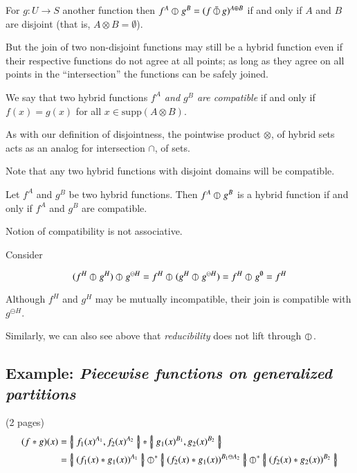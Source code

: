 For $g:U \to S$ another function then $f^A \varobar^{} g^B = (f \,\bar{\varobar}\, g)^{A \oplus B}$ if and only if $A$ and $B$ are disjoint (that is, $A \otimes B = \emptyset$).

But the join of two non-disjoint functions may still be a hybrid function even if their respective functions do not agree at all points; as long as they agree on all points in the ``intersection'' the functions can be safely joined.

\begin{definition}
We say that two hybrid functions \emph{$f^A$ and $g^B$ are compatible} if and only if $f(x) = g(x)$ for all $x \in \text{supp} (A \otimes B)$.
\end{definition}

As with our definition of disjointness, the pointwise product $\otimes$, of hybrid sets acts as an analog for intersection $\cap$, of sets.

Note that any two hybrid functions with disjoint domains will be compatible.


\begin{theorem}
Let $f^A$ and $g^B$ be two hybrid functions. Then $f^A \varobar^{} g^B$ is a hybrid function if and only if $f^A$ and $g^B$ are compatible.
\end{theorem}

Notion of compatibility is not associative.

Consider

\begin{equation}
(f^H \varobar^{} g^H) \varobar^{} g^{\ominus H} = f^H \varobar^{} (g^H \varobar^{} g^{\ominus H}) = f^H \varobar^{} g^\emptyset = f^H
\end{equation}

Although $f^H$ and $g^H$ may be mutually incompatible, their join is compatible with $g^{\ominus H}$.

Similarly, we can also see above that \emph{reducibility} does not lift through $\varobar^{}$.


\newpage \addtocounter{page}{1}

\subsection{Example: \emph{Piecewise functions on generalized partitions}} 
(2 pages)
\begin{align*}
(f * g) (x) &= \hset{ f_1(x)^{A_1} , f_2(x)^{A_2}} * \hset{g_1(x)^{B_1} , g_2(x)^{B_2}} \\
 &= \hset{(f_1(x)*g_1(x))^{A_1}} \hjoin[*] \hset{(f_2(x)*g_1(x))^{B_1 \ominus A_2}} \hjoin[*] \hset{(f_2(x) * g_2(x))^{B_2}}
\end{align*}

